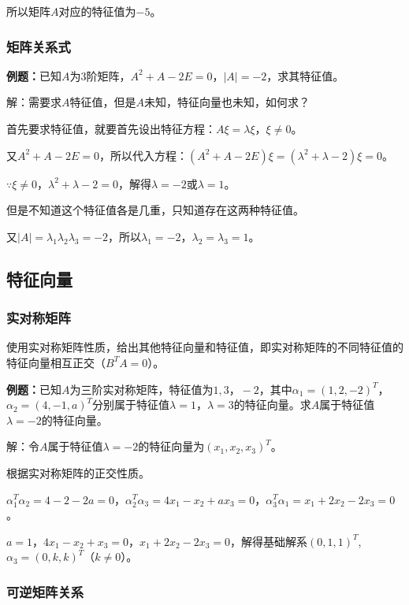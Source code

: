 所以矩阵$A$对应的特征值为$-5$。

\subsubsection{矩阵关系式}

\textbf{例题：}已知$A$为3阶矩阵，$A^2+A-2E=0$，$\vert A\vert=-2$，求其特征值。

解：需要求$A$特征值，但是$A$未知，特征向量也未知，如何求？

首先要求特征值，就要首先设出特征方程：$A\xi=\lambda\xi$，$\xi\neq0$。

又$A^2+A-2E=0$，所以代入方程：$(A^2+A-2E)\xi=(\lambda^2+\lambda-2)\xi=0$。

$\because\xi\neq0$，$\lambda^2+\lambda-2=0$，解得$\lambda=-2$或$\lambda=1$。

但是不知道这个特征值各是几重，只知道存在这两种特征值。

又$\vert A\vert=\lambda_1\lambda_2\lambda_3=-2$，所以$\lambda_1=-2$，$\lambda_2=\lambda_3=1$。

\subsection{特征向量}

\subsubsection{实对称矩阵}

使用实对称矩阵性质，给出其他特征向量和特征值，即实对称矩阵的不同特征值的特征向量相互正交（$B^TA=0$）。

\textbf{例题：}已知$A$为三阶实对称矩阵，特征值为$1,3，-2$，其中$\alpha_1=(1,2,-2)^T$，$\alpha_2=(4,-1,a)^T$分别属于特征值$\lambda=1$，$\lambda=3$的特征向量。求$A$属于特征值$\lambda=-2$的特征向量。

解：令$A$属于特征值$\lambda=-2$的特征向量为$(x_1,x_2,x_3)^T$。

根据实对称矩阵的正交性质。

$\alpha_1^T\alpha_2=4-2-2a=0$，$\alpha_2^T\alpha_3=4x_1-x_2+ax_3=0$，$\alpha_3^T\alpha_1=x_1+2x_2-2x_3=0$。

$a=1$，$4x_1-x_2+x_3=0$，$x_1+2x_2-2x_3=0$，解得基础解系$(0,1,1)^T$,$\alpha_3=(0,k,k)^T$（$k\neq0$）。

\subsubsection{可逆矩阵关系}

